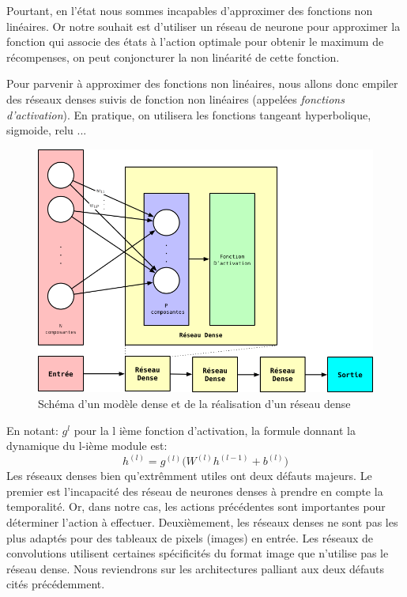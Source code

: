 Pourtant, en l'état nous sommes incapables d'approximer des fonctions non linéaires. Or notre souhait est d'utiliser un réseau de neurone pour approximer la fonction qui associe des états à l'action optimale pour obtenir le maximum de récompenses, on peut conjoncturer la non linéarité de cette fonction.

Pour parvenir à approximer des fonctions non linéaires, nous allons donc empiler des réseaux denses suivis de fonction non linéaires (appelées \emph{fonctions d'activation}). En pratique, on utilisera les fonctions tangeant hyperbolique, sigmoide, relu ...

\begin{figure}[ht]
\begin{center}
    \includegraphics[scale=.3]{./assets/DeepLearning/Dense}
    \caption{Schéma d'un modèle dense et de la réalisation d'un réseau dense}
\end{center}
\end{figure}
En notant: $g^l$ pour la l ième fonction d'activation, la formule donnant la dynamique du l-ième module est: $$h^{(l)} = g^{(l)}\big(W^{(l)}h^{(l-1)} + b^{(l)} \big)$$
Les réseaux denses bien qu'extrêmment utiles ont deux défauts majeurs. Le premier est l'incapacité des réseau de neurones denses à prendre en compte la temporalité. Or, dans notre cas, les actions précédentes sont importantes pour déterminer l'action à effectuer. Deuxièmement, les réseaux denses ne sont pas les plus adaptés pour des tableaux de pixels (images) en entrée. Les réseaux de convolutions utilisent certaines spécificités du format image que n'utilise pas le réseau dense. Nous reviendrons sur les architectures palliant aux deux défauts cités précédemment. 

